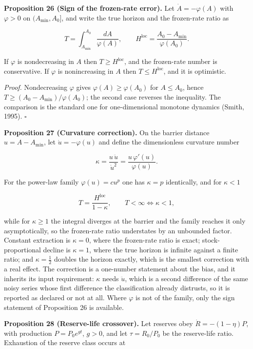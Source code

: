 \documentclass[11pt]{article}
\begin{document}
\textbf{Proposition 26 (Sign of the frozen-rate error).} Let \(\dot A=-\varphi(A)\) with \(\varphi>0\) on \((A_{\min},A_0]\), and write the true horizon and the frozen-rate ratio as 

$$T=\int_{A_{\min}}^{A_0}\frac{dA}{\varphi(A)}, \qquad H^{\mathrm{loc}}=\frac{A_0-A_{\min}}{\varphi(A_0)} .$$

 If \(\varphi\) is nondecreasing in \(A\) then \(T\ge H^{\mathrm{loc}}\), and the frozen-rate number is conservative. If \(\varphi\) is nonincreasing in \(A\) then \(T\le H^{\mathrm{loc}}\), and it is optimistic.

\emph{Proof.} Nondecreasing \(\varphi\) gives \(\varphi(A)\ge\varphi(A_0)\) for \(A\le A_0\), hence \(T\ge(A_0-A_{\min})/\varphi(A_0)\); the second case reverses the inequality. The comparison is the standard one for one-dimensional monotone dynamics (Smith, 1995). \(\square\)

\textbf{Proposition 27 (Curvature correction).} On the barrier distance \(u=A-A_{\min}\), let \(\dot u=-\varphi(u)\) and define the dimensionless curvature number 

$$\kappa=\frac{u\,\ddot u}{\dot u^{2}}=\frac{u\,\varphi'(u)}{\varphi(u)} .$$

 For the power-law family \(\varphi(u)=cu^{p}\) one has \(\kappa=p\) identically, and for \(\kappa<1\) 

$$T=\frac{H^{\mathrm{loc}}}{1-\kappa}, \qquad T<\infty\iff\kappa<1,$$

 while for \(\kappa\ge1\) the integral diverges at the barrier and the family reaches it only asymptotically, so the frozen-rate ratio understates by an unbounded factor. Constant extraction is \(\kappa=0\), where the frozen-rate ratio is exact; stock-proportional decline is \(\kappa=1\), where the true horizon is infinite against a finite ratio; and \(\kappa=\tfrac12\) doubles the horizon exactly, which is the smallest correction with a real effect. The correction is a one-number statement about the bias, and it inherits its input requirement: \(\kappa\) needs \(\ddot u\), which is a second difference of the same noisy series whose first difference the classification already distrusts, so it is reported as declared or not at all. Where \(\varphi\) is not of the family, only the sign statement of Proposition 26 is available.

\textbf{Proposition 28 (Reserve-life crossover).} Let reserves obey \(\dot R=-(1-\eta)P\), with production \(P=P_0e^{gt}\), \(g>0\), and let \(\tau=R_0/\allowbreak{}P_0\) be the reserve-life ratio. Exhaustion of the reserve class occurs at 
\end{document}
